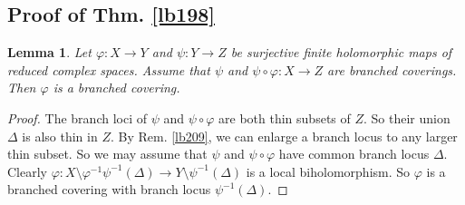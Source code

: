 \documentclass[12pt,b5paper,notitlepage]{report}
\theoremstyle{definition}
\theoremstyle{plain}
\newtheorem{lm}[df]{Lemma}
\numberwithin{equation}{section}
\begin{document}
\subsection{Proof of Thm. \ref{lb198}}




\begin{lm}\label{lb211}
Let $\varphi:X\rightarrow Y$ and $\psi:Y\rightarrow Z$ be surjective finite holomorphic maps of reduced complex spaces. Assume that $\psi$ and $\psi\circ\varphi:X\rightarrow Z$ are branched coverings. Then $\varphi$ is a branched covering.
\end{lm}


\begin{proof}
The branch loci of $\psi$ and $\psi\circ\varphi$ are both thin subsets of $Z$. So their union $\Delta$ is also thin in $Z$. By Rem. \ref{lb209}, we can enlarge  a branch locus to any larger thin subset. So we may assume that $\psi$ and $\psi\circ\varphi$ have common branch locus $\Delta$. Clearly $\varphi:X\setminus\varphi^{-1}\psi^{-1}(\Delta)\rightarrow Y\setminus \psi^{-1}(\Delta)$ is a local biholomorphism. So $\varphi$ is a branched covering with branch locus $\psi^{-1}(\Delta)$.
\end{proof}
\end{document}
